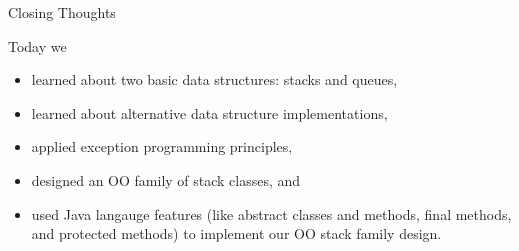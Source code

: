 \documentclass{beamer}
\begin{document}
\begin{frame}[fragile]{Closing Thoughts}


Today we
\begin{itemize}
\item learned about two basic data structures: stacks and queues,
\item learned about alternative data structure implementations,
\item applied exception programming principles,
\item designed an OO family of stack classes, and
\item used Java langauge features (like abstract classes and methods, final methods, and protected methods) to implement our OO stack family design.
\end{itemize}


\end{frame}
\end{document}
